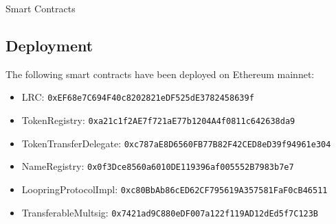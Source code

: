 \documentclass[UTF8,nofonts]{article}
\makeatletter
\newenvironment{figurehere}
 {\def\@captype{figure}}
 {}
\makeatother
\begin{document}
\begin{appendices}
\begin{center}
\begin{figurehere}
\caption{Smart Contracts}
\label{fig:smartcontracts}
\end{figurehere}
\end{center}

\subsection{Deployment}

The following smart contracts have been deployed on Ethereum mainnet:
\begin{itemize}
\item LRC: \verb|0xEF68e7C694F40c8202821eDF525dE3782458639f|
\item TokenRegistry: \verb|0xa21c1f2AE7f721aE77b1204A4f0811c642638da9|
\item TokenTransferDelegate: \verb|0xc787aE8D6560FB77B82F42CED8eD39f94961e304|
\item NameRegistry: \verb|0x0f3Dce8560a6010DE119396af005552B7983b7e7|
\item LoopringProtocolImpl: \verb|0xc80BbAb86cED62CF795619A357581FaF0cB46511|
\item TransferableMultsig: \verb|0x7421ad9C880eDF007a122f119AD12dEd5f7C123B|
\end{itemize}

\end{appendices}
\end{document}
